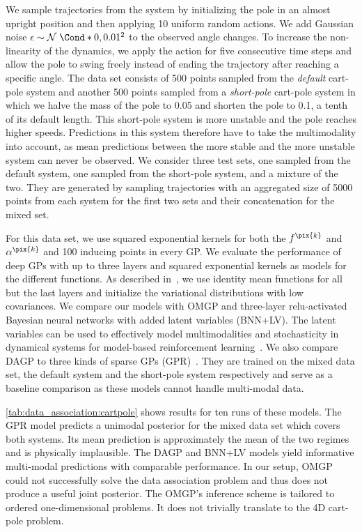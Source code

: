 We sample trajectories from the system by initializing the pole in an almost upright position and then applying 10 uniform random actions.
We add Gaussian noise $\epsilon \sim \Gaussian*{0, 0.01^2}$ to the observed angle changes.
To increase the non-linearity of the dynamics, we apply the action for five consecutive time steps and allow the pole to swing freely instead of ending the trajectory after reaching a specific angle.
The data set consists of 500 points sampled from the \emph{default} cart-pole system and another 500 points sampled from a \emph{short-pole} cart-pole system in which we halve the mass of the pole to 0.05 and shorten the pole to 0.1, a tenth of its default length.
This short-pole system is more unstable and the pole reaches higher speeds.
Predictions in this system therefore have to take the multimodality into account, as mean predictions between the more stable and the more unstable system can never be observed.
We consider three test sets, one sampled from the default system, one sampled from the short-pole system, and a mixture of the two.
They are generated by sampling trajectories with an aggregated size of 5000 points from each system for the first two sets and their concatenation for the mixed set.

For this data set, we use squared exponential kernels for both the $f^{\pix{k}}$ and $\alpha^{\pix{k}}$ and 100 inducing points in every GP.
We evaluate the performance of deep GPs with up to three layers and squared exponential kernels as models for the different functions.
As described in~\parencite{salimbeni_doubly_2017,kaiser_bayesian_2018}, we use identity mean functions for all but the last layers and initialize the variational distributions with low covariances.
We compare our models with OMGP and three-layer relu-activated Bayesian neural networks with added latent variables (BNN+LV).
The latent variables can be used to effectively model multimodalities and stochasticity in dynamical systems for model-based reinforcement learning~\parencite{depeweg_decomposition_2018}.
We also compare DAGP to three kinds of sparse GPs (GPR)~\parencite{hensman_scalable_2015}.
They are trained on the mixed data set, the default system and the short-pole system respectively and serve as a baseline comparison as these models cannot handle multi-modal data.

\cref{tab:data_association:cartpole} shows results for ten runs of these models.
The GPR model predicts a unimodal posterior for the mixed data set which covers both systems.
Its mean prediction is approximately the mean of the two regimes and is physically implausible.
The DAGP and BNN+LV models yield informative multi-modal predictions with comparable performance.
In our setup, OMGP could not successfully solve the data association problem and thus does not produce a useful joint posterior.
The OMGP's inference scheme is tailored to ordered one-dimensional problems.
It does not trivially translate to the 4D cart-pole problem.

